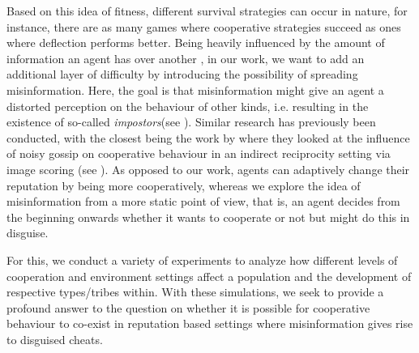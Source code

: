 \documentclass[sigconf]{acmart}
\newcommand{\impostors}{\textit{impostors}\xspace}
\begin{document}

    Based on this idea of fitness, different survival strategies can occur in nature, for instance, there are as many games where cooperative strategies succeed as ones where deflection performs better.
    Being heavily influenced by the amount of information an agent has over another \cite{wallace_misinformation_1973}, in our work, we want to add an additional layer of difficulty by introducing the possibility of spreading misinformation.
    Here, the goal is that misinformation might give an agent a distorted perception on the behaviour of other kinds, i.e. resulting in the existence of so-called \impostors (see ).
    Similar research has previously been conducted, with the closest being the work by \citeauthor{szamado_deception_2016} \cite{szamado_deception_2016} where they looked at the influence of noisy gossip on cooperative behaviour in an indirect reciprocity setting via image scoring (see ).
    As opposed to our work, agents can adaptively change their reputation by being more cooperatively, whereas we explore the idea of misinformation from a more static point of view, that is, an agent decides from the beginning onwards whether it wants to cooperate or not but might do this in disguise.

    For this, we conduct a variety of experiments to analyze how different levels of cooperation and environment settings affect a population and the development of respective types/tribes within.
    With these simulations, we seek to provide a profound answer to the question on whether it is possible for cooperative behaviour to co-exist in reputation based settings where misinformation gives rise to disguised cheats.
\end{document}
